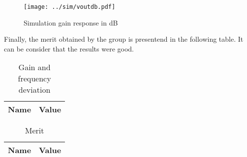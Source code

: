 \begin{figure}[H] \centering
\texttt{[image: ../sim/voutdb.pdf]}
\caption{Simulation gain response in dB}
\label{fig:ng6}
\end{figure}

\par Finally, the merit obtained by the group is presentend in the following table. It can be consider that the results were good.

\begin{table}[H]
  \centering
  \begin{tabular}{|l|r|}
    \hline    
    {\bf Name} & {\bf Value } \\ \hline
    
  \end{tabular}
  \caption{Gain and frequency deviation}
  \label{tab:ng2}
\end{table}

\begin{table}[H]
  \centering
  \begin{tabular}{|l|r|}
    \hline    
    {\bf Name} & {\bf Value} \\ \hline
    
  \end{tabular}
  \caption{Merit}
  \label{tab:ng5}
\end{table}


